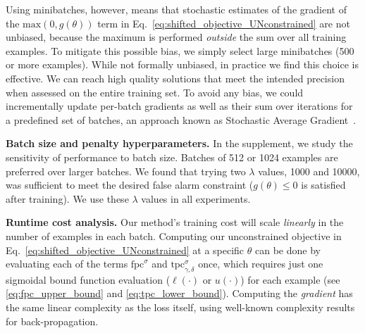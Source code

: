 Using minibatches, however, means that stochastic estimates of the gradient of the $\text{max}(0, g(\theta))$ term in Eq.~\eqref{eq:shifted_objective_UNconstrained} are not unbiased, because the maximum is performed \emph{outside} the sum over all training examples. 
To mitigate this possible bias, we simply select large minibatches (500 or more examples). While not formally unbiased, in practice we find this choice is effective.
We can reach high quality solutions that meet the intended precision when assessed on the entire training set.
To avoid any bias, we could incrementally update per-batch gradients as well as their sum over iterations for a predefined set of batches, an approach known as Stochastic Average Gradient~\citep{schmidtMinimizingFiniteSums2017}.



\textbf{Batch size and penalty hyperparameters.} In the supplement, we study the sensitivity of performance to batch size. Batches of 512 or 1024 examples are preferred over larger batches. We found that trying two $\lambda$ values, 1000 and 10000, was sufficient to meet the desired false alarm constraint ($g(\theta) \leq 0$ is satisfied after training). We use these $\lambda$ values in all experiments.

\textbf{Runtime cost analysis.} Our method's training cost will scale \emph{linearly} in the number of examples in each batch. Computing our unconstrained objective in Eq.~\eqref{eq:shifted_objective_UNconstrained} at a specific $\theta$ can be done by evaluating each of the terms $\text{fpc}^{\sigma}$ and $\text{tpc}^{\sigma}_{\gamma,\delta}$ once, which requires just one sigmoidal bound function evaluation ($\ell(\cdot)$ or $u(\cdot)$) for each example (see \eqref{eq:fpc_upper_bound} and \eqref{eq:tpc_lower_bound}).
Computing the \emph{gradient} has the same linear complexity as the loss itself, using well-known complexity results for back-propagation.

